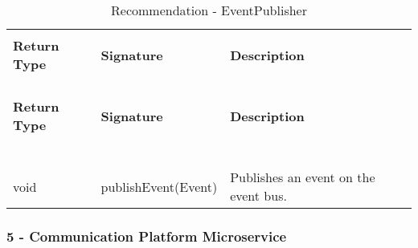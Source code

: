 \begin{longtable}{p{}p{}p{}}
    \caption{Recommendation - EventPublisher}
    \vspace{0.5em}\\
    \hline
    \vspace{0.5em}\\
    \textbf{Return Type} & \textbf{Signature} & \textbf{Description} \\
    \vspace{0.5em}\\
    \hline
    \vspace{0.5em}\\
    \endfirsthead
    \vspace{0.5em}\\
    \hline
    \vspace{0.5em}\\
    \textbf{Return Type} & \textbf{Signature} & \textbf{Description} \\
    \vspace{0.5em}\\
    \hline
    \vspace{0.5em}\\
    \endhead
    
    \vspace{0.5em}\\
    \hline
    \vspace{0.5em}\\
    \endfoot
    
    \vspace{0.5em}\\
    \hline
    \vspace{0.5em}\\
    \endlastfoot
    
    void &
    publishEvent(Event) &
    Publishes an event on the event bus. \\

\end{longtable}

\subsubsection{5 - Communication Platform Microservice}

